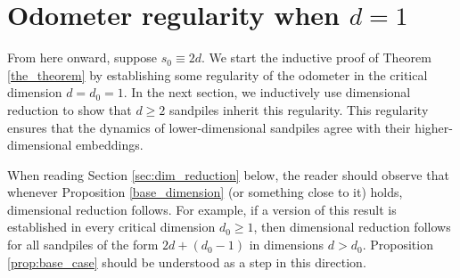 \documentclass[12pt]{amsart}
\begin{document}
	
	
	\section{Odometer regularity when \texorpdfstring{$d = 1$}{d=1}} \label{sec:base_regularity}
		From here onward, suppose $s_0 \equiv 2 d$. We start the inductive proof of Theorem \ref{the_theorem} by establishing some regularity of the odometer in the critical dimension $d=d_0=1$.   In the next section, we inductively use dimensional reduction to show that $d \geq 2$ sandpiles inherit this regularity. This regularity ensures that the dynamics of lower-dimensional sandpiles agree with their higher-dimensional embeddings. 
		
		When reading Section \ref{sec:dim_reduction} below, the reader should observe that whenever Proposition \ref{base_dimension} (or something close to it) holds, dimensional reduction 
		follows. For example, if a version of this result is established in every critical dimension $d_0 \geq 1$,  
		then dimensional reduction follows for all sandpiles of the form $2 d + (d_0 - 1)$ in dimensions $d > d_0$. 
		Proposition \ref{prop:base_case} should be understood as a step in this direction. 


	
	
\end{document}
